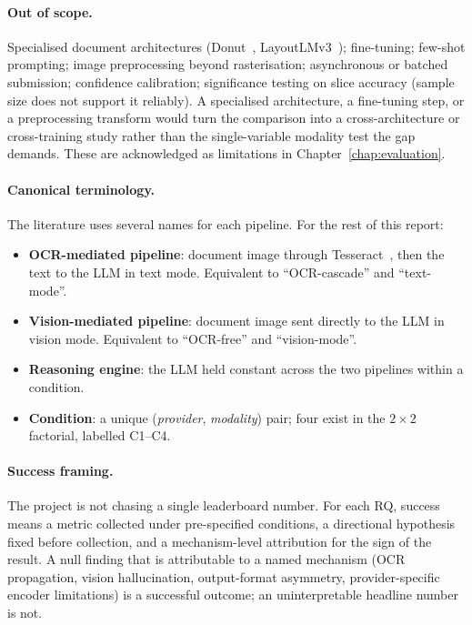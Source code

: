 \paragraph{Out of scope.} Specialised document architectures
(Donut~\cite{kim2022donut}, LayoutLMv3~\cite{huang2022layoutlmv3});
fine-tuning; few-shot prompting; image preprocessing beyond
rasterisation; asynchronous or batched submission; confidence
calibration; significance testing on slice accuracy (sample size
does not support it reliably). A specialised architecture, a
fine-tuning step, or a preprocessing transform would turn the
comparison into a cross-architecture or cross-training study rather
than the single-variable modality test the gap demands. These are
acknowledged as limitations in Chapter~\ref{chap:evaluation}.

\paragraph{Canonical terminology.} The literature uses several names
for each pipeline. For the rest of this report:

\begin{itemize}
\item \textbf{OCR-mediated pipeline}: document image through
Tesseract~\cite{smith2007tesseract}, then the text to the LLM in
text mode. Equivalent to ``OCR-cascade'' and ``text-mode''.
\item \textbf{Vision-mediated pipeline}: document image sent
directly to the LLM in vision mode. Equivalent to ``OCR-free'' and
``vision-mode''.
\item \textbf{Reasoning engine}: the LLM held constant across the
two pipelines within a condition.
\item \textbf{Condition}: a unique (\textit{provider},
\textit{modality}) pair; four exist in the $2\times 2$ factorial,
labelled C1--C4.
\end{itemize}

\paragraph{Success framing.} The project is not chasing a single
leaderboard number. For each RQ, success means a metric collected
under pre-specified conditions, a directional hypothesis fixed
before collection, and a mechanism-level attribution for the sign
of the result. A null finding that is attributable to a named
mechanism (OCR propagation, vision hallucination, output-format
asymmetry, provider-specific encoder limitations) is a successful
outcome; an uninterpretable headline number is not.

